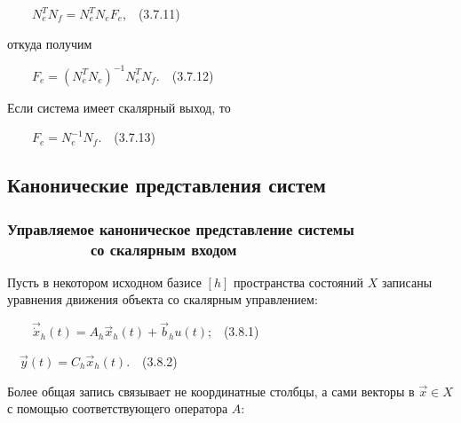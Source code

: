 \documentclass[a4paper]{article}
\begin{document}
{\begin{russian}\sffamily
\ \ \ \  $N_e^TN_f=N_e^TN_eF_e$,\ \ (3.7.11)
\end{russian}}

{\begin{russian}\sffamily
откуда получим
\end{russian}}

{\begin{russian}\sffamily
\ \ \ \  $F_e=(N_e^TN_e)^{-1}N_e^TN_f$.\ \ (3.7.12)
\end{russian}}

{\begin{russian}\sffamily
Если система имеет скалярный выход, то
\end{russian}}

{\begin{russian}\sffamily
\ \ \ \  $F_e=N_e^{-1}N_f$.\ \ (3.7.13)
\end{russian}}

\subsection{Канонические представления систем}
\hypertarget{RefHeadingToc455659738}{}\subsubsection[Управляемое каноническое представление системы \ \ 
\ \ \ \ \ \ \ \ со ска­лярным входом]{Управляемое каноническое представление системы \ \  \ \ \ \ \ \ \ \ со ска­лярным
входом}
\hypertarget{RefHeadingToc455659739}{}
\bigskip

{\begin{russian}\sffamily
Пусть в некотором исходном базисе  $[h]$ пространства состояний  $X$ записаны уравнения движения объекта со скалярным
управлением:
\end{russian}}

{\begin{russian}\sffamily
\ \ \ \  $\vec{\dot x}_h(t)=A_h\vec x_h(t)+\vec b_hu(t)$;\ \ (3.8.1)
\end{russian}}

{\begin{russian}\sffamily
\ \  $\vec y(t)=C_h\vec x_h(t)$.\ \ (3.8.2)
\end{russian}}

{\begin{russian}\sffamily
Более общая запись связывает не координатные столбцы, а сами векторы в  $\vec x\in X$ с помощью соответствующего
оператора  $A$:
\end{russian}}
\end{document}
